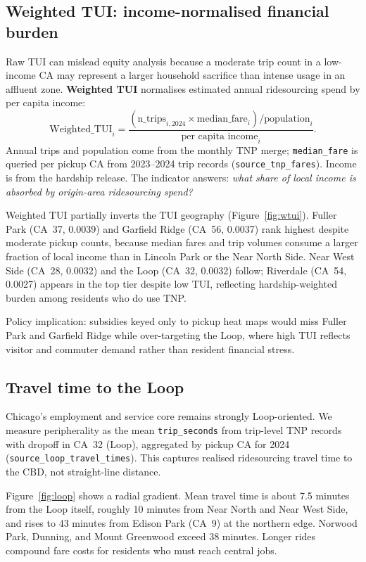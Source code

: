 \documentclass[10pt, a4paper]{article}
\begin{document}
\subsection{Weighted TUI: income-normalised financial burden}
Raw TUI can mislead equity analysis because a moderate trip count in a low-income CA may represent a larger household sacrifice than intense usage in an affluent zone. \textbf{Weighted TUI} normalises estimated annual ridesourcing spend by per capita income:
\begin{equation}
    \mathrm{Weighted\_TUI}_i = \frac{(\text{n\_trips}_{i,2024} \times \text{median\_fare}_i) / \text{population}_i}{\text{per capita income}_i}.
\end{equation}
Annual trips and population come from the monthly TNP merge; \texttt{median\_fare} is queried per pickup CA from 2023--2024 trip records (\texttt{source\_tnp\_fares}). Income is from the hardship release. The indicator answers: \emph{what share of local income is absorbed by origin-area ridesourcing spend?}

Weighted TUI partially inverts the TUI geography (Figure~\ref{fig:wtui}). Fuller Park (CA~37, 0.0039) and Garfield Ridge (CA~56, 0.0037) rank highest despite moderate pickup counts, because median fares and trip volumes consume a larger fraction of local income than in Lincoln Park or the Near North Side. Near West Side (CA~28, 0.0032) and the Loop (CA~32, 0.0032) follow; Riverdale (CA~54, 0.0027) appears in the top tier despite low TUI, reflecting hardship-weighted burden among residents who do use TNP.

Policy implication: subsidies keyed only to pickup heat maps would miss Fuller Park and Garfield Ridge while over-targeting the Loop, where high TUI reflects visitor and commuter demand rather than resident financial stress.

\subsection{Travel time to the Loop}
Chicago's employment and service core remains strongly Loop-oriented. We measure peripherality as the mean \texttt{trip\_seconds} from trip-level TNP records with dropoff in CA~32 (Loop), aggregated by pickup CA for 2024 (\texttt{source\_loop\_travel\_times}). This captures realised ridesourcing travel time to the CBD, not straight-line distance.

Figure~\ref{fig:loop} shows a radial gradient. Mean travel time is about 7.5 minutes from the Loop itself, roughly 10 minutes from Near North and Near West Side, and rises to 43 minutes from Edison Park (CA~9) at the northern edge. Norwood Park, Dunning, and Mount Greenwood exceed 38 minutes. Longer rides compound fare costs for residents who must reach central jobs.
\end{document}
